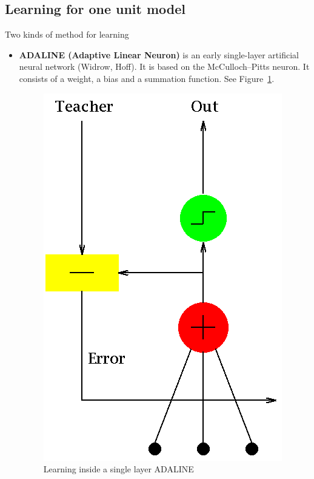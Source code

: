 \documentclass[../main.tex]{subfiles}
\begin{document}
\subsection{Learning for one unit model}
Two kinds of method for learning
\begin{itemize}
    \item \textbf{ADALINE (Adaptive Linear Neuron)} is an early single-layer artificial neural network (Widrow, Hoff). It is based on the McCulloch–Pitts neuron. It consists of a weight, a bias and a summation function. See Figure~\ref{fig:4_Adaline_flow_chart}.
    
    \begin{figure}
        \centering
        \includegraphics[scale = 0.3]{lectures/4_neural_networks/4_Adaline_flow_chart.png}
        \caption{Learning inside a single layer ADALINE}
        \label{fig:4_Adaline_flow_chart}
    \end{figure}
    

\end{itemize}
\end{document}
